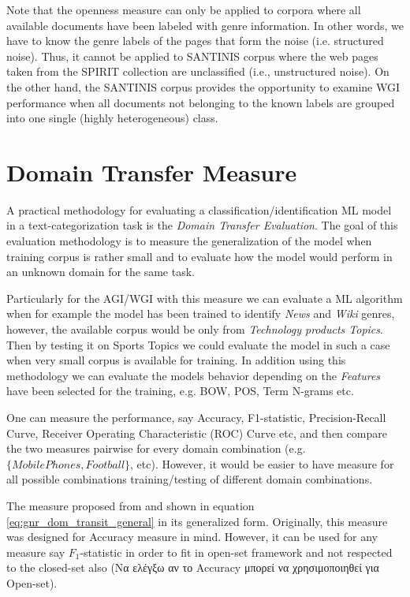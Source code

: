 Note that the openness measure can only be applied to corpora where all available documents have been labeled with genre information. In other words, we have to know the genre labels of the pages that form the noise (i.e. structured noise). Thus, it cannot be applied to SANTINIS corpus where the web pages taken from the SPIRIT collection are unclassified (i.e., unstructured noise). On the other hand, the SANTINIS corpus provides the opportunity to examine WGI performance when all documents not belonging to the known labels are grouped into one single (highly heterogeneous) class.



\section{Domain Transfer Measure}\label{chap:eval_methods:sec:domain_transfer_measure}

A practical methodology for evaluating a classification/identification ML model in a text-categorization task is the \textit{Domain Transfer Evaluation}. The goal of this evaluation methodology is to measure the generalization of the model when training corpus is rather small and to evaluate how the model would perform in an unknown domain for the same task. 

Particularly for the AGI/WGI with this measure we can evaluate a ML algorithm when for example the model has been trained to identify \textit{News} and \textit{Wiki} genres, however, the available corpus would be only from \textit{Technology products Topics}. Then by testing it on {Sports Topics} we could evaluate the model in such a case when very small corpus is available for training. In addition using this methodology we can evaluate the models behavior depending on the \textit{Features} have been selected for the training, e.g. BOW, POS, Term N-grams etc. 

One can measure the performance, say Accuracy, F1-statistic, Precision-Recall Curve,  Receiver Operating Characteristic (ROC) Curve etc, and then compare the two measures pairwise for every domain combination (e.g. $\{Mobile Phones, Football\}$, etc). However, it would be easier to have measure for all possible combinations training/testing of different domain combinations. 

The measure proposed from \parencite{finn2006learning} and shown in equation \ref{eq:gnr_dom_transit_general} in its generalized form. Originally, this measure was designed for Accuracy measure in mind. However, it can be used for any measure say $F_{1}$-statistic in order to fit in open-set framework and not respected to the closed-set also (Να ελέγξω αν το Accuracy μπορεί να χρησιμοποιηθεί για Open-set). 

